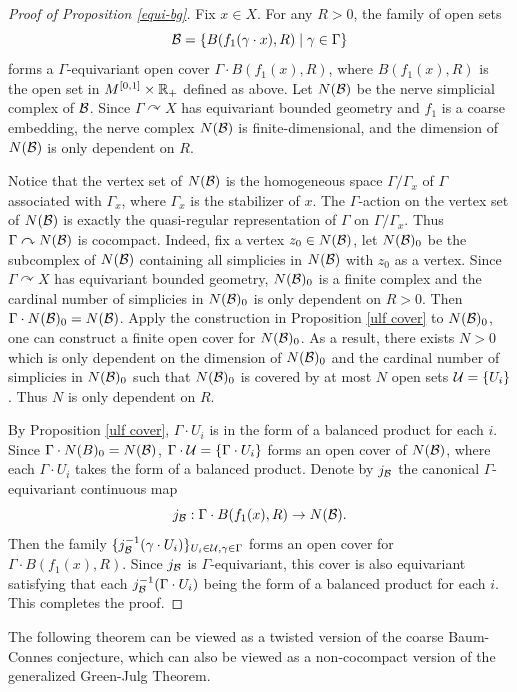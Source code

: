 \documentclass[11pt]{article}
\theoremstyle{definition}
\theoremstyle{plain}
\def\Ga{\Gamma}
\def\car{\curvearrowright}
\begin{document}
\begin{proof}[Proof of Proposition \ref{equi-bg}]
Fix $x\in X$. For any $R>0$, the family of open sets
$$\B=\{B(f_1(\gamma\cdot x),R)\mid \gamma\in\Ga\}$$
forms a $\Ga$-equivariant open cover $\Ga\cdot B(f_1(x),R)$, where $B(f_1(x),R)$ is the open set in $M^{[0,1]}\times\mathbb R_+$ defined as above. Let $N(\mathcal B)$ be the nerve simplicial complex of $\mathcal B$. Since $\Ga\car X$ has equivariant bounded geometry and $f_1$ is a coarse embedding, the nerve complex $N(\mathcal B)$ is finite-dimensional, and the dimension of $N(\mathcal B)$ is only dependent on $R$.

Notice that the vertex set of $N(\mathcal B)$ is the homogeneous space $\Ga/\Ga_x$ of $\Ga$ associated with $\Ga_x$, where $\Ga_x$ is the stabilizer of $x$. The $\Ga$-action on the vertex set of $N(\mathcal B)$ is exactly the quasi-regular representation of $\Ga$ on $\Ga/\Ga_x$. Thus $\Ga\car N(\B)$ is cocompact. Indeed, fix a vertex $z_0\in N(\mathcal B)$, let $N(\mathcal B)_0$ be the subcomplex of $N(\mathcal B)$ containing all simplicies in $N(\mathcal B)$ with $z_0$ as a vertex.  Since $\Ga\car X$ has equivariant bounded geometry, $N(\mathcal B)_0$ is a finite complex and the cardinal number of simplicies in $N(\mathcal B)_0$ is only dependent on $R>0$. Then $\Ga\cdot N(\B)_0=N(\B)$. Apply the construction in Proposition \ref{ulf cover} to $N(\mathcal B)_0$, one can construct a finite open cover for $N(\mathcal B)_0$. As a result, there exists $N>0$ which is only dependent on the dimension of $N(\mathcal B)_0$ and the cardinal number of simplicies in $N(\mathcal B)_0$ such that $N(\mathcal B)_0$ is covered by at most $N$ open sets $\mathcal U=\{U_i\}$. Thus $N$ is only dependent on $R$. 

By Proposition \ref{ulf cover}, $\Ga\cdot U_i$ is in the form of a balanced product for each $i$. Since $\Ga\cdot N(B)_0=N(\B)$, $\Ga\cdot\U=\{\Ga\cdot U_i\}$ forms an open cover of $N(\mathcal B)$, where each $\Ga\cdot U_i$ takes the form of a balanced product. Denote by $j_{\mathcal B}$ the canonical $\Ga$-equivariant continuous map
$$j_{\B}:\Ga\cdot B(f_1(x),R)\to N(\B).$$
Then the family $\{j^{-1}_{\B}(\gamma\cdot U_i)\}_{U_i\in\U,\gamma\in\Ga}$ forms an open cover for $\Ga\cdot B(f_1(x),R)$. Since $j_{\mathcal B}$ is $\Ga$-equivariant, this cover is also equivariant satisfying that each $j^{-1}_{\B}(\Ga\cdot U_i)$ being the form of a balanced product for each $i$. This completes the proof.
\end{proof}







The following theorem can be viewed as a twisted version of the coarse Baum-Connes conjecture, which can also be viewed as a non-cocompact version of the generalized Green-Julg Theorem.
\end{document}
